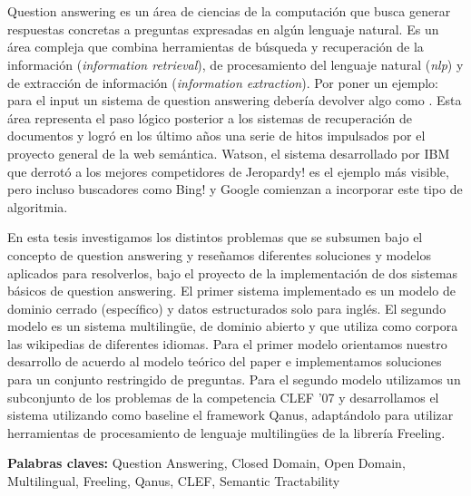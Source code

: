 \chapter*{\runtitulo}
Question answering es un área de ciencias de la computación que busca generar respuestas concretas a preguntas expresadas en algún lenguaje natural. Es un área compleja que combina herramientas de búsqueda y recuperación de la información (\textit{information retrieval}), de procesamiento del lenguaje natural (\textit{nlp}) y de extracción de información (\textit{information extraction}). Por poner un ejemplo: para el input \textit{} un sistema de question answering debería devolver algo como .
Esta área representa el paso lógico posterior a los sistemas de recuperación de documentos y logró en los último años una serie de hitos impulsados por el proyecto general de la web semántica. Watson, el sistema desarrollado por IBM que derrotó a los mejores competidores de Jeropardy! es el ejemplo más visible, pero incluso buscadores como Bing! y Google comienzan a incorporar este tipo de algoritmia.

En esta tesis investigamos los distintos problemas que se subsumen bajo el concepto de question answering y reseñamos diferentes soluciones y modelos aplicados para resolverlos, bajo el proyecto de la implementación de dos sistemas básicos de question answering. El primer sistema implementado es un modelo de dominio cerrado (específico) y datos estructurados solo para inglés. El segundo modelo es un sistema multilingüe, de dominio abierto y que utiliza como corpora las wikipedias de diferentes idiomas. Para el primer modelo orientamos nuestro desarrollo de acuerdo al modelo teórico del paper \cite{QADB1} e implementamos soluciones para un conjunto restringido de preguntas.  Para el segundo modelo utilizamos  un subconjunto de los problemas de la competencia CLEF '07 y desarrollamos el sistema utilizando como baseline el framework Qanus, adaptándolo para utilizar herramientas de procesamiento de lenguaje multilingües de la librería Freeling.
\bigskip

\noindent\textbf{Palabras claves:} Question Answering, Closed Domain, Open Domain, Multilingual, Freeling, Qanus, CLEF, Semantic Tractability